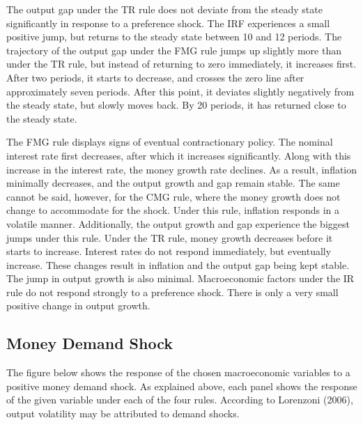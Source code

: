 \documentclass[11pt,preprint, authoryear]{elsarticle}
\numberwithin{equation}{section}
\numberwithin{figure}{section}
\numberwithin{table}{section}
\begin{document}
The output gap under the TR rule does not deviate from the steady state
significantly in response to a preference shock. The IRF experiences a
small positive jump, but returns to the steady state between 10 and 12
periods. The trajectory of the output gap under the FMG rule jumps up
slightly more than under the TR rule, but instead of returning to zero
immediately, it increases first. After two periods, it starts to
decrease, and crosses the zero line after approximately seven periods.
After this point, it deviates slightly negatively from the steady state,
but slowly moves back. By 20 periods, it has returned close to the
steady state.

The FMG rule displays signs of eventual contractionary policy. The
nominal interest rate first decreases, after which it increases
significantly. Along with this increase in the interest rate, the money
growth rate declines. As a result, inflation minimally decreases, and
the output growth and gap remain stable. The same cannot be said,
however, for the CMG rule, where the money growth does not change to
accommodate for the shock. Under this rule, inflation responds in a
volatile manner. Additionally, the output growth and gap experience the
biggest jumps under this rule. Under the TR rule, money growth decreases
before it starts to increase. Interest rates do not respond immediately,
but eventually increase. These changes result in inflation and the
output gap being kept stable. The jump in output growth is also minimal.
Macroeconomic factors under the IR rule do not respond strongly to a
preference shock. There is only a very small positive change in output
growth.

\hypertarget{money-demand-shock}{%
\subsection{Money Demand Shock}\label{money-demand-shock}}

The figure below shows the response of the chosen macroeconomic
variables to a positive money demand shock. As explained above, each
panel shows the response of the given variable under each of the four
rules. According to Lorenzoni (2006), output volatility may be
attributed to demand shocks.
\end{document}
